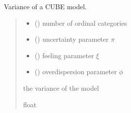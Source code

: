 \documentclass[letterpaper,10pt,english]{sphinxmanual}
\begin{document}

\begin{fulllineitems}
\label{\detokenize{cubmods:cubmods.cube.var}}
\pysigstartsignatures
{}
\pysigstopsignatures
\sphinxAtStartPar
Variance of a CUBE model.
\begin{quote}\begin{description}
\begin{itemize}
\item {} 
\sphinxAtStartPar
{} () \textendash{} number of ordinal categories

\item {} 
\sphinxAtStartPar
{} () \textendash{} uncertainty parameter \(\pi\)

\item {} 
\sphinxAtStartPar
{} () \textendash{} feeling parameter \(\xi\)

\item {} 
\sphinxAtStartPar
{} () \textendash{} overdispersion parameter \(\phi\)

\end{itemize}

\sphinxAtStartPar
the variance of the model

\sphinxAtStartPar
float

\end{description}\end{quote}

\end{fulllineitems}

\end{document}
